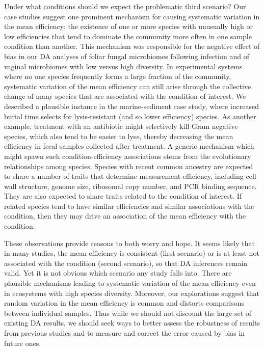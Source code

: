 \documentclass[
]{article}
\begin{document}
Under what conditions should we expect the problematic third scenario?
Our case studies suggest one prominent mechanism for causing systematic variation in the mean efficiency: the existence of one or more species with unusually high or low efficiencies that tend to dominate the community more often in one sample condition than another.
This mechanism was responsible for the negative effect of bias in our DA analyses of foliar fungal microbiomes following infection and of vaginal microbiomes with low versus high diversity.
In experimental systems where no one species frequently forms a large fraction of the community, systematic variation of the mean efficiency can still arise through the collective change of many species that are associated with the condition of interest.
We described a plausible instance in the marine-sediment case study, where increased burial time selects for lysis-resistant (and so lower efficiency) species.
As another example, treatment with an antibiotic might selectively kill Gram negative species, which also tend to be easier to lyse, thereby decreasing the mean efficiency in fecal samples collected after treatment.
A generic mechanism which might spawn such condition-efficiency associations stems from the evolutionary relationships among species.
Species with recent common ancestry are expected to share a number of traits that determine measurement efficiency, including cell wall structure, genome size, ribosomal copy number, and PCR binding sequence.
They are also expected to share traits related to the condition of interest.
If related species tend to have similar efficiencies and similar associations with the condition, then they may drive an association of the mean efficiency with the condition.

These observations provide reasons to both worry and hope.
It seems likely that in many studies, the mean efficiency is consistent (first scenario) or is at least not associated with the condition (second scenario), so that DA inferences remain valid.
Yet it is not obvious which scenario any study falls into.
There are plausible mechanisms leading to systematic variation of the mean efficiency even in ecosystems with high species diversity.
Moreover, our explorations suggest that random variation in the mean efficiency is common and distorts comparisons between individual samples.
Thus while we should not discount the large set of existing DA results, we should seek ways to better assess the robustness of results from previous studies and to measure and correct the error caused by bias in future ones.
\end{document}
